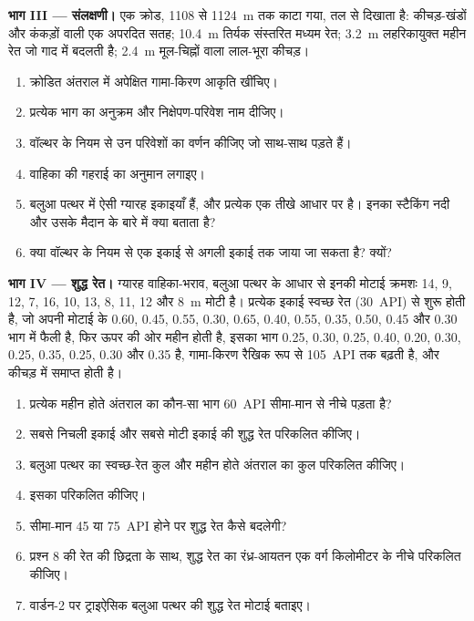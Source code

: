 \begin{problem}[{सप्ताहांत समस्या --- एक काल्पनिक कुएँ के लॉग, छिद्रता, संलक्षणी और शुद्ध रेत,
वार्डन अभिनति में}]
\medskip\noindent\textbf{भाग III --- संलक्षणी।} एक क्रोड, 1108 से
\qty{1124}{m} तक काटा गया, तल से दिखाता है: कीचड़-खंडों और कंकड़ों वाली एक अपरदित सतह;
\qty{10.4}{m} तिर्यक संस्तरित मध्यम रेत; \qty{3.2}{m} लहरिकायुक्त
महीन रेत जो गाद में बदलती है; \qty{2.4}{m} मूल-चिह्नों वाला लाल-भूरा कीचड़।
\begin{enumerate}[resume]
\item क्रोडित अंतराल में अपेक्षित गामा-किरण आकृति खींचिए।
\item प्रत्येक भाग का अनुक्रम और निक्षेपण-परिवेश नाम दीजिए।
\item वॉल्थर के नियम से उन परिवेशों का वर्णन कीजिए जो साथ-साथ पड़ते हैं।
\item वाहिका की गहराई का अनुमान लगाइए।
\item बलुआ पत्थर में ऐसी ग्यारह इकाइयाँ हैं, और प्रत्येक एक तीखे आधार पर है।
  इनका स्टैकिंग नदी और उसके मैदान के बारे में क्या बताता है?
\item क्या वॉल्थर के नियम से एक इकाई से अगली इकाई तक जाया जा सकता है? क्यों?
\end{enumerate}

\medskip\noindent\textbf{भाग IV --- शुद्ध रेत।} ग्यारह वाहिका-भराव,
बलुआ पत्थर के आधार से इनकी मोटाई क्रमशः 14, 9, 12, 7, 16, 10, 13, 8, 11, 12 और
\qty{8}{m} मोटी है। प्रत्येक इकाई स्वच्छ रेत (\qty{30}{API}) से शुरू होती है, जो
अपनी मोटाई के 0.60, 0.45, 0.55, 0.30, 0.65, 0.40, 0.55, 0.35, 0.50,
0.45 और 0.30 भाग में फैली है, फिर ऊपर की ओर महीन होती है, इसका भाग 0.25, 0.30, 0.25, 0.40,
0.20, 0.30, 0.25, 0.35, 0.25, 0.30 और 0.35 है, गामा-किरण रैखिक रूप से
\qty{105}{API} तक बढ़ती है, और कीचड़ में समाप्त होती है।
\begin{enumerate}[resume]
\item प्रत्येक महीन होते अंतराल का कौन-सा भाग \qty{60}{API}
  सीमा-मान से नीचे पड़ता है?
\item सबसे निचली इकाई और सबसे मोटी इकाई की शुद्ध रेत परिकलित कीजिए।
\item बलुआ पत्थर का स्वच्छ-रेत कुल और
  महीन होते अंतराल का कुल परिकलित कीजिए।
\item इसका  परिकलित कीजिए।
\item सीमा-मान 45 या
  \qty{75}{API} होने पर शुद्ध रेत कैसे बदलेगी?
\item प्रश्न 8 की रेत की छिद्रता के साथ, शुद्ध रेत का रंध्र-आयतन
  एक वर्ग किलोमीटर के नीचे परिकलित कीजिए।
\item वार्डन-2 पर ट्राइऐसिक बलुआ पत्थर की शुद्ध रेत मोटाई बताइए।
\end{enumerate}
\end{problem}
